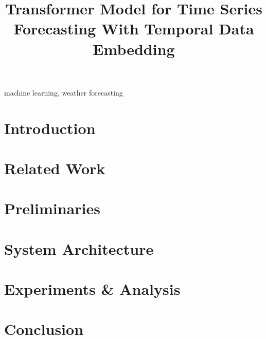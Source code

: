 





\newpage

\title{Transformer Model for Time Series Forecasting With Temporal Data Embedding}
\author{
    \and
    \and
    \and
}


\maketitle

\begin{abstract}

\end{abstract}

\begin{IEEEkeywords}
machine learning, weather forecasting
\end{IEEEkeywords}

\section{Introduction}


\section{Related Work}\label{sec:relatedwork}




\section{Preliminaries}


\section{System Architecture}\label{sec:system architecture} %









\section{Experiments \& Analysis}\label{sec:ExpRes}


\section{Conclusion}






%

